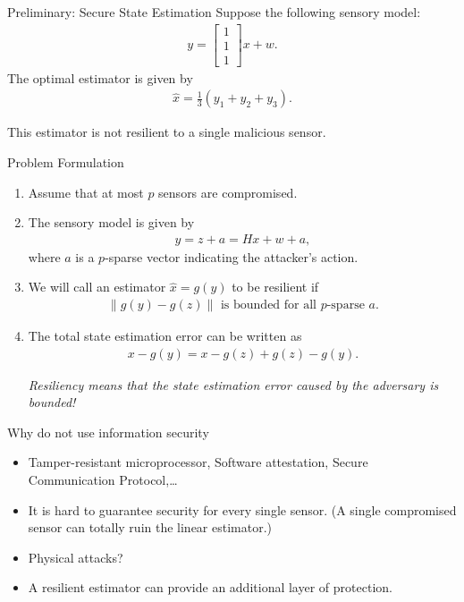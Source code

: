 \documentclass{beamer}
\begin{document}
\begin{frame}{Preliminary: Secure State Estimation}
  Suppose the following sensory model:
  \begin{align*}
    y = \begin{bmatrix}
      1\\
      1\\
      1
    \end{bmatrix}x + w.
  \end{align*}
  The optimal estimator is given by
  \begin{align*}
    \hat x = \frac{1}{3}\left(y_1+y_2+y_3\right).
  \end{align*}
  
  This estimator is not resilient to a single malicious sensor.
\end{frame}

\begin{frame}{Problem Formulation}
  \begin{enumerate}
  \item Assume that at most $p$ sensors are compromised.
  \item The sensory model is given by
    \begin{align*}
      y = z + a = Hx + w +a,
    \end{align*}
    where $a$ is a $p$-sparse vector indicating the attacker's action.
  \item We will call an estimator $\hat x = g(y)$ to be resilient if
    \begin{align*}
      \|g(y) - g(z)\|\text{ is bounded for all $p$-sparse $a$}.
    \end{align*}
  \item The total state estimation error can be written as
    \begin{align*}
      x-g(y) = x-g(z) + g(z)-g(y).
    \end{align*}

    \emph{Resiliency means that the state estimation error caused by the adversary is bounded!}
  \end{enumerate}
\end{frame}

\begin{frame}{Why do not use information security}
  \begin{itemize}
  \item Tamper-resistant microprocessor, Software attestation, Secure Communication Protocol,\dots
  \item It is hard to guarantee security for every single sensor. (A single compromised sensor can totally ruin the linear estimator.)
  \item Physical attacks?
  \item A resilient estimator can provide an additional layer of protection.
  \end{itemize}
\end{frame}
\end{document}
